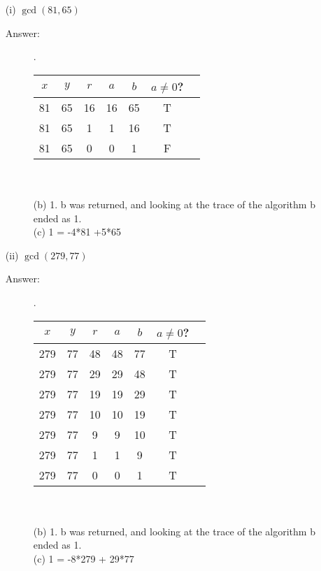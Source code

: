 \documentclass[12pt, oneside]{article}
\begin{document}
\begin{enumerate}
\begin{enumerate}
    \item[(i)] $\gcd(81, 65)$
    \begin{description}
      \item[Answer:] .\\
      \begin{tabular}{c|c|c|c|c|c|c|}
        $x$ & $y$  & $r$ & $a$ & $b$ & $a \neq 0$?\\
        \hline 
         81 & 65 & 16 & 16 & 65 & T\\
         81 & 65 & 1 & 1 & 16 & T\\
         81 & 65 & 0 & 0 & 1 & F\\
        \end{tabular}\\\\
        (b) 1. b was returned, and looking at the trace of the algorithm b ended as 1.\\
        (c) 1 = -4*81 +5*65
    \end{description}
    \item[(ii)] $\gcd(279, 77)$
    \begin{description}
      \item[Answer:] .\\
      \begin{tabular}{c|c|c|c|c|c|c|}
        $x$ & $y$  & $r$ & $a$ & $b$ & $a \neq 0$?\\
        \hline 
        279 & 77 & 48 & 48 & 77 & T\\
        279 & 77 & 29 & 29 & 48 & T\\
        279 & 77 & 19 & 19 & 29 & T\\
        279 & 77 & 10 & 10 & 19 & T\\
        279 & 77 & 9 & 9 & 10 & T\\
        279 & 77 & 1 & 1 & 9 & T\\
        279 & 77 & 0 & 0 & 1 & T\\
        \end{tabular}\\\\
        (b) 1. b was returned, and looking at the trace of the algorithm b ended as 1.\\
        (c) 1 = -8*279 + 29*77
    \end{description}
\end{enumerate}




\end{enumerate}
\end{document}
